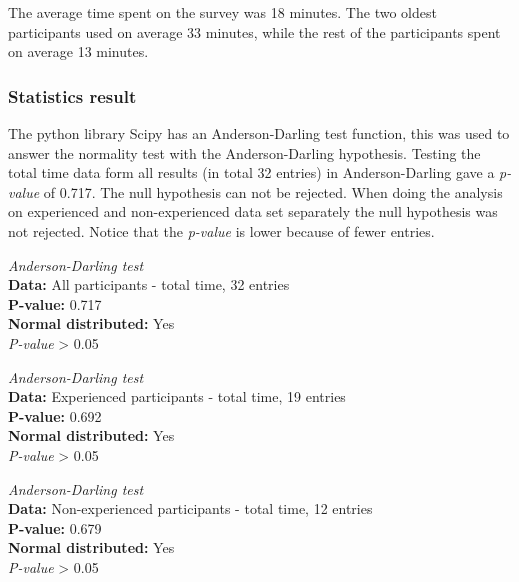 The average time spent on the survey was 18 minutes. The two oldest participants used on average 33 minutes, while the rest of the participants spent on average 13 minutes. 


\subsubsection{Statistics result}
The python library Scipy has an Anderson-Darling test function, this was used to answer the normality test with the Anderson-Darling hypothesis. Testing the total time data form all results (in total 32 entries) in Anderson-Darling gave a \textit{p-value} of 0.717. The null hypothesis can not be rejected. When doing the analysis on experienced and non-experienced data set separately the null hypothesis was not rejected. Notice that the \textit{p-value} is lower because of fewer entries. \newline

\begin{framed}{\noindent\centering
\textit{Anderson-Darling test} \\
\textbf{Data:} All participants - total time, 32 entries\\
  \textbf{P-value:} 0.717  \\
  \textbf{Normal distributed:} Yes\\
  \textit{P-value} > 0.05
  \par}
\end{framed}


\begin{framed}{\noindent\centering
\textit{Anderson-Darling test} \\
\textbf{Data:} Experienced participants - total time, 19 entries\\
  \textbf{P-value:} 0.692  \\
  \textbf{Normal distributed:} Yes\\
  \textit{P-value} > 0.05
  \par}
\end{framed}


\begin{framed}{\noindent\centering
\textit{Anderson-Darling test} \\
\textbf{Data:} Non-experienced participants - total time, 12 entries\\
  \textbf{P-value:} 0.679  \\
  \textbf{Normal distributed:} Yes\\
  \textit{P-value} > 0.05
  \par}
\end{framed}




